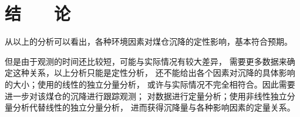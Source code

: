 
\chapter*{\hfill 结　　论 \hfill}

从以上的分析可以看出，各种环境因素对煤仓沉降的定性影响，基本符合预期。

但是由于观测的时间还比较短，可能与实际情况有较大差异，
需要更多数据来确定这种关系，以上分析只能是定性分析，
还不能给出各个因素对沉降的具体影响的大小；使用的线性的独立分量分析，
或许与实际情况不完全相符合。因此需要进一步对该煤仓的沉降进行跟踪观测；
对数据进行定量分析；使用非线性独立分量分析代替线性的独立分量分析，
进而获得沉降量与各种影响因素的定量关系。
